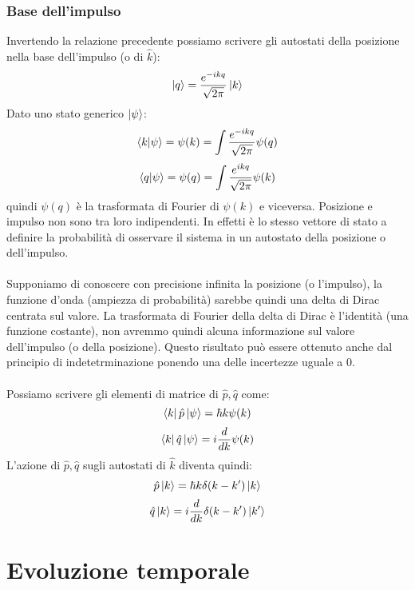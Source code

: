 \documentclass{article}
\begin{document}
\subsubsection{Base dell'impulso}
Invertendo la relazione precedente possiamo scrivere gli autostati della posizione nella base dell'impulso (o di $\hat{k}$):
$$ \ket{q}=\frac{e^{-ikq}}{\sqrt{2\pi}}\ket{k} $$
Dato uno stato generico $\ket{\psi}$:
$$ \bra{k}\ket{\psi}=\psi(k)=\int\frac{e^{-ikq}}{\sqrt{2\pi}}\psi(q) $$
$$ \bra{q}\ket{\psi}=\psi(q)=\int\frac{e^{ikq}}{\sqrt{2\pi}}\psi(k) $$
quindi $\psi(q)$ è la trasformata di Fourier di $\psi(k)$ e viceversa. Posizione e impulso non sono tra loro indipendenti. In effetti è lo stesso vettore di stato a definire la probabilità di osservare il sistema in un autostato della posizione o dell'impulso.\\\\
Supponiamo di conoscere con precisione infinita la posizione (o l'impulso), la funzione d'onda (ampiezza di probabilità) sarebbe quindi una delta di Dirac centrata sul valore. La trasformata di Fourier della delta di Dirac è l'identità (una funzione costante), non avremmo quindi alcuna informazione sul valore dell'impulso (o della posizione). Questo risultato può essere ottenuto anche dal principio di indetetrminazione ponendo una delle incertezze uguale a 0.\\\\
Possiamo scrivere gli elementi di matrice di $\hat{p},\hat{q}$ come:
$$ \bra{k}\hat{p}\ket{\psi}=\hbar k\psi(k) $$
$$ \bra{k}\hat{q}\ket{\psi}=i\frac{d}{dk}\psi(k) $$
L'azione di $\hat{p},\hat{q}$ sugli autostati di $\hat{k}$ diventa quindi:
$$ \hat{p}\ket{k}=\hbar k\delta(k-k')\ket{k} $$
$$ \hat{q}\ket{k}=i\frac{d}{dk}\delta(k-k')\ket{k'} $$

\newpage
\section{Evoluzione temporale}
\end{document}
